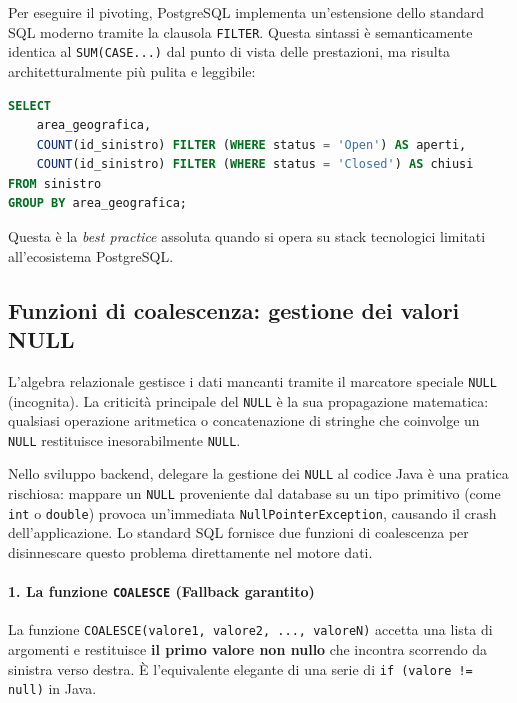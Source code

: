 \begin{bestpractice}
Per eseguire il pivoting, PostgreSQL implementa un'estensione dello standard SQL moderno tramite la clausola \texttt{FILTER}. Questa sintassi è semanticamente identica al \texttt{SUM(CASE...)} dal punto di vista delle prestazioni, ma risulta architetturalmente più pulita e leggibile:

\begin{lstlisting}[language=SQL, basicstyle=\ttfamily\small, keywordstyle=\color{blue}\bfseries]
SELECT 
    area_geografica,
    COUNT(id_sinistro) FILTER (WHERE status = 'Open') AS aperti,
    COUNT(id_sinistro) FILTER (WHERE status = 'Closed') AS chiusi
FROM sinistro
GROUP BY area_geografica;
\end{lstlisting}
Questa è la \textit{best practice} assoluta quando si opera su stack tecnologici limitati all'ecosistema PostgreSQL.
\end{bestpractice}

\subsection{Funzioni di coalescenza: gestione dei valori NULL}

L'algebra relazionale gestisce i dati mancanti tramite il marcatore speciale \texttt{NULL} (incognita). La criticità principale del \texttt{NULL} è la sua propagazione matematica: qualsiasi operazione aritmetica o concatenazione di stringhe che coinvolge un \texttt{NULL} restituisce inesorabilmente \texttt{NULL}. 

Nello sviluppo backend, delegare la gestione dei \texttt{NULL} al codice Java è una pratica rischiosa: mappare un \texttt{NULL} proveniente dal database su un tipo primitivo (come \texttt{int} o \texttt{double}) provoca un'immediata \texttt{NullPointerException}, causando il crash dell'applicazione. Lo standard SQL fornisce due funzioni di coalescenza per disinnescare questo problema direttamente nel motore dati.

\paragraph{1. La funzione \texttt{COALESCE} (Fallback garantito)}
La funzione \texttt{COALESCE(valore1, valore2, ..., valoreN)} accetta una lista di argomenti e restituisce \textbf{il primo valore non nullo} che incontra scorrendo da sinistra verso destra. È l'equivalente elegante di una serie di \texttt{if (valore != null)} in Java.

